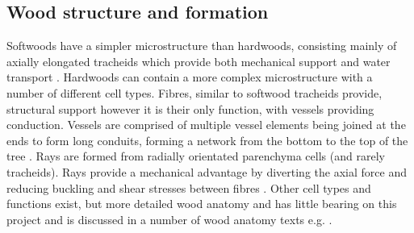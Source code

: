\subsection{Wood structure and formation}
Softwoods have a simpler microstructure than hardwoods, consisting mainly of
axially elongated tracheids which provide both mechanical support and water
transport \cite{bowyer2007forest}. Hardwoods can contain a more complex microstructure with a number
of different cell types. Fibres, similar to softwood tracheids provide,
structural support however it is their only function, with vessels providing
conduction. Vessels are comprised of
multiple vessel elements being joined at the ends to form long conduits,
forming a network from the bottom to  the top of the tree \cite{walker1993primary}. Rays are formed from radially orientated  parenchyma cells (and rarely tracheids). Rays provide a mechanical advantage by diverting the axial force and reducing buckling and shear stresses between fibres \cite{mattheck1997wood}. Other cell types and functions exist, but more detailed wood anatomy and
has little bearing on this project and is discussed in a number of wood anatomy
texts e.g. \cite{fromm2013cellular}.